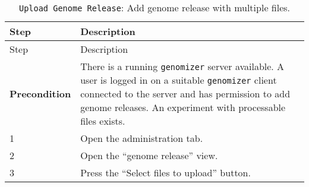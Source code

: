 \begin{longtable}[c]{@{}ll@{}}
\caption{\texttt{Upload\ Genome\ Release}: Add genome release with
multiple files.}\tabularnewline
\toprule
\begin{minipage}[b]{0.31\columnwidth}\raggedright\strut
Step
\strut\end{minipage} &
\begin{minipage}[b]{0.63\columnwidth}\raggedright\strut
Description
\strut\end{minipage}\tabularnewline
\midrule
\endfirsthead
\toprule
\begin{minipage}[b]{0.31\columnwidth}\raggedright\strut
Step
\strut\end{minipage} &
\begin{minipage}[b]{0.63\columnwidth}\raggedright\strut
Description
\strut\end{minipage}\tabularnewline
\midrule
\endhead
\begin{minipage}[t]{0.31\columnwidth}\raggedright\strut
\textbf{Precondition}
\strut\end{minipage} &
\begin{minipage}[t]{0.63\columnwidth}\raggedright\strut
There is a running \texttt{genomizer} server available. A user is logged
in on a suitable \texttt{genomizer} client connected to the server and
has permission to add genome releases. An experiment with processable
files exists.
\strut\end{minipage}\tabularnewline
\begin{minipage}[t]{0.31\columnwidth}\raggedright\strut
1
\strut\end{minipage} &
\begin{minipage}[t]{0.63\columnwidth}\raggedright\strut
Open the administration tab.
\strut\end{minipage}\tabularnewline
\begin{minipage}[t]{0.31\columnwidth}\raggedright\strut
2
\strut\end{minipage} &
\begin{minipage}[t]{0.63\columnwidth}\raggedright\strut
Open the ``genome release'' view.
\strut\end{minipage}\tabularnewline
\begin{minipage}[t]{0.31\columnwidth}\raggedright\strut
3
\strut\end{minipage} &
\begin{minipage}[t]{0.63\columnwidth}\raggedright\strut
Press the ``Select files to upload'' button.
\strut\end{minipage}\tabularnewline

\end{longtable}
